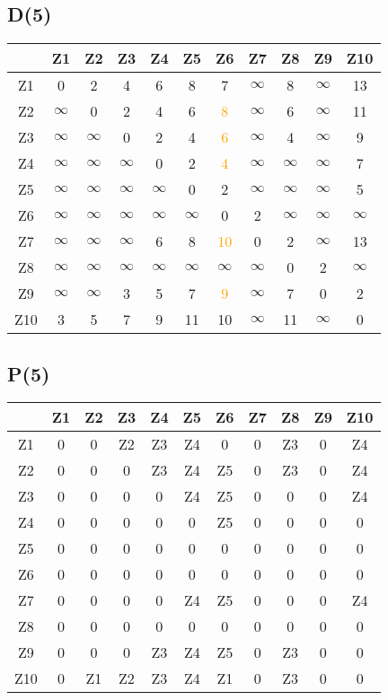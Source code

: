 \documentclass[a4paper,11pt]{article}
\begin{document}
\subsection*{D(5)}
\begin{center}
\begin{tabular}{c|cccccccccc}
 & Z1 & Z2 & Z3 & Z4 & Z5 & Z6 & Z7 & Z8 & Z9 & Z10 \\ \hline
Z1 & 0 & 2 & 4 & 6 & 8 & 7 & $\infty$ & 8 & $\infty$ & 13 \\
Z2 & $\infty$ & 0 & 2 & 4 & 6 & \textcolor{orange}{8} & $\infty$ & 6 & $\infty$ & 11 \\
Z3 & $\infty$ & $\infty$ & 0 & 2 & 4 & \textcolor{orange}{6} & $\infty$ & 4 & $\infty$ & 9 \\
Z4 & $\infty$ & $\infty$ & $\infty$ & 0 & 2 & \textcolor{orange}{4} & $\infty$ & $\infty$ & $\infty$ & 7 \\
Z5 & $\infty$ & $\infty$ & $\infty$ & $\infty$ & 0 & 2 & $\infty$ & $\infty$ & $\infty$ & 5 \\
Z6 & $\infty$ & $\infty$ & $\infty$ & $\infty$ & $\infty$ & 0 & 2 & $\infty$ & $\infty$ & $\infty$ \\
Z7 & $\infty$ & $\infty$ & $\infty$ & 6 & 8 & \textcolor{orange}{10} & 0 & 2 & $\infty$ & 13 \\
Z8 & $\infty$ & $\infty$ & $\infty$ & $\infty$ & $\infty$ & $\infty$ & $\infty$ & 0 & 2 & $\infty$ \\
Z9 & $\infty$ & $\infty$ & 3 & 5 & 7 & \textcolor{orange}{9} & $\infty$ & 7 & 0 & 2 \\
Z10 & 3 & 5 & 7 & 9 & 11 & 10 & $\infty$ & 11 & $\infty$ & 0 \\
\end{tabular}
\end{center}
\subsection*{P(5)}
\begin{center}
\begin{tabular}{c|cccccccccc}
 & Z1 & Z2 & Z3 & Z4 & Z5 & Z6 & Z7 & Z8 & Z9 & Z10 \\ \hline
Z1 & 0 & 0 & Z2 & Z3 & Z4 & 0 & 0 & Z3 & 0 & Z4 \\
Z2 & 0 & 0 & 0 & Z3 & Z4 & Z5 & 0 & Z3 & 0 & Z4 \\
Z3 & 0 & 0 & 0 & 0 & Z4 & Z5 & 0 & 0 & 0 & Z4 \\
Z4 & 0 & 0 & 0 & 0 & 0 & Z5 & 0 & 0 & 0 & 0 \\
Z5 & 0 & 0 & 0 & 0 & 0 & 0 & 0 & 0 & 0 & 0 \\
Z6 & 0 & 0 & 0 & 0 & 0 & 0 & 0 & 0 & 0 & 0 \\
Z7 & 0 & 0 & 0 & 0 & Z4 & Z5 & 0 & 0 & 0 & Z4 \\
Z8 & 0 & 0 & 0 & 0 & 0 & 0 & 0 & 0 & 0 & 0 \\
Z9 & 0 & 0 & 0 & Z3 & Z4 & Z5 & 0 & Z3 & 0 & 0 \\
Z10 & 0 & Z1 & Z2 & Z3 & Z4 & Z1 & 0 & Z3 & 0 & 0 \\
\end{tabular}
\end{center}
\newpage
\end{document}
